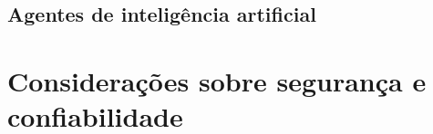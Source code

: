 
\subsection{Agentes de inteligência artificial}
\label{subsec:agentes_ia}


\section{Considerações sobre segurança e confiabilidade}
\label{sec:seguranca_confiabilidade}

